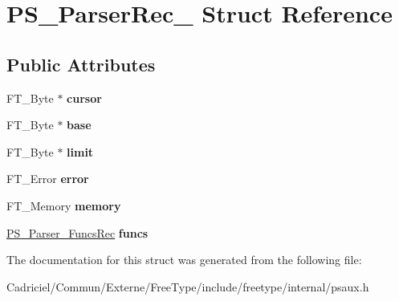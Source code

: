 \hypertarget{struct_p_s___parser_rec__}{}\section{P\+S\+\_\+\+Parser\+Rec\+\_\+ Struct Reference}
\label{struct_p_s___parser_rec__}
\subsection*{Public Attributes}
\begin{DoxyCompactItemize}
\item 
F\+T\+\_\+\+Byte $\ast$ {\bfseries cursor}\hypertarget{struct_p_s___parser_rec___a6ed189bc25c03814bdafad63819ddfe7}{}\label{struct_p_s___parser_rec___a6ed189bc25c03814bdafad63819ddfe7}

\item 
F\+T\+\_\+\+Byte $\ast$ {\bfseries base}\hypertarget{struct_p_s___parser_rec___a30528f6a9caffce2fd44ef2d5a38e5bd}{}\label{struct_p_s___parser_rec___a30528f6a9caffce2fd44ef2d5a38e5bd}

\item 
F\+T\+\_\+\+Byte $\ast$ {\bfseries limit}\hypertarget{struct_p_s___parser_rec___af3310795fd73530036fb32ec4385ea3d}{}\label{struct_p_s___parser_rec___af3310795fd73530036fb32ec4385ea3d}

\item 
F\+T\+\_\+\+Error {\bfseries error}\hypertarget{struct_p_s___parser_rec___a7a1432cb4d8bb603663f1258224c8ec4}{}\label{struct_p_s___parser_rec___a7a1432cb4d8bb603663f1258224c8ec4}

\item 
F\+T\+\_\+\+Memory {\bfseries memory}\hypertarget{struct_p_s___parser_rec___a3e2206deb6c0d73f51c8c71d5db1db1f}{}\label{struct_p_s___parser_rec___a3e2206deb6c0d73f51c8c71d5db1db1f}

\item 
\hyperlink{struct_p_s___parser___funcs_rec__}{P\+S\+\_\+\+Parser\+\_\+\+Funcs\+Rec} {\bfseries funcs}\hypertarget{struct_p_s___parser_rec___a450031fd9e77e55bf424dc64a8d2659d}{}\label{struct_p_s___parser_rec___a450031fd9e77e55bf424dc64a8d2659d}

\end{DoxyCompactItemize}


The documentation for this struct was generated from the following file\+:\begin{DoxyCompactItemize}
\item 
Cadriciel/\+Commun/\+Externe/\+Free\+Type/include/freetype/internal/psaux.\+h\end{DoxyCompactItemize}
